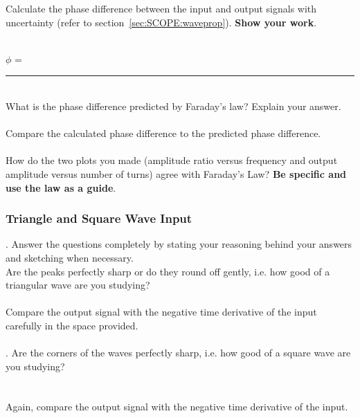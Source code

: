 \vfill
\noindent Calculate the phase difference between the input and output 
signals with 
uncertainty (refer to section~\ref{sec:SCOPE:waveprop}). {\bf Show your work}.\\ 
\vspace*{4cm}\\
\hspace*{2cm} {$\phi$ =~\rule{3cm}{.1mm}}\\ 
\noindent What is the phase difference predicted by Faraday's law? Explain your answer.\\
\vspace*{2.5cm} \\

\noindent Compare the calculated phase difference to the predicted phase difference. \\
\vspace*{2cm} \\
\noindent How do the two plots you made (amplitude ratio versus frequency and
output amplitude versus number of turns) agree with Faraday's Law?  
{\bf Be specific and use the law as a guide}.

\vfill 
\pagebreak

\subsubsection{Triangle and Square Wave Input}
. Answer the questions completely by  stating your 
reasoning
behind your answers and sketching when necessary. 
\ \\
\noindent Are the peaks perfectly sharp or do they round off gently, i.e.
how good of a triangular wave are you studying? \\
\vspace*{1.5cm} \\
\noindent Compare the output signal with the negative time derivative of the
input carefully in the space provided. \\
\vspace*{5cm} \\

\clearpage
{}.
\noindent Are the corners of the waves perfectly sharp, i.e. how good 
of a square wave are you studying? \\
\vspace*{1cm} \\
\vspace*{1cm} \\
\noindent Again, compare the output signal with the negative time derivative
of the input. \\
\vspace*{5cm} \\
\clearpage

